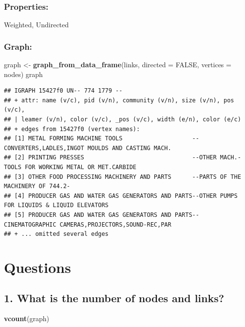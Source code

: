 \documentclass[
]{article}
\newenvironment{Shaded}{\begin{snugshade}}{\end{snugshade}}
\newcommand{\AttributeTok}[1]{\textcolor[rgb]{0.13,0.29,0.53}{#1}}
\newcommand{\ConstantTok}[1]{\textcolor[rgb]{0.56,0.35,0.01}{#1}}
\newcommand{\FunctionTok}[1]{\textcolor[rgb]{0.13,0.29,0.53}{\textbf{#1}}}
\newcommand{\NormalTok}[1]{#1}
\newcommand{\OtherTok}[1]{\textcolor[rgb]{0.56,0.35,0.01}{#1}}
\begin{document}
\subsubsection{Properties:}\label{properties}

Weighted, Undirected

\subsubsection{Graph:}\label{graph}

\begin{Shaded}
\begin{Highlighting}[]
\NormalTok{graph }\OtherTok{\textless{}{-}} \FunctionTok{graph\_from\_data\_frame}\NormalTok{(links, }\AttributeTok{directed =} \ConstantTok{FALSE}\NormalTok{, }\AttributeTok{vertices =}\NormalTok{ nodes)}
\NormalTok{graph}
\end{Highlighting}
\end{Shaded}

\begin{verbatim}
## IGRAPH 15427f0 UN-- 774 1779 -- 
## + attr: name (v/c), pid (v/n), community (v/n), size (v/n), pos (v/c),
## | leamer (v/n), color (v/c), _pos (v/c), width (e/n), color (e/c)
## + edges from 15427f0 (vertex names):
## [1] METAL FORMING MACHINE TOOLS                    --CONVERTERS,LADLES,INGOT MOULDS AND CASTING MACH.  
## [2] PRINTING PRESSES                               --OTHER MACH.-TOOLS FOR WORKING METAL OR MET.CARBIDE
## [3] OTHER FOOD PROCESSING MACHINERY AND PARTS      --PARTS OF THE MACHINERY OF 744.2-                  
## [4] PRODUCER GAS AND WATER GAS GENERATORS AND PARTS--OTHER PUMPS FOR LIQUIDS & LIQUID ELEVATORS        
## [5] PRODUCER GAS AND WATER GAS GENERATORS AND PARTS--CINEMATOGRAPHIC CAMERAS,PROJECTORS,SOUND-REC,PAR  
## + ... omitted several edges
\end{verbatim}

\section{Questions}\label{questions}

\subsection{1. What is the number of nodes and
links?}\label{what-is-the-number-of-nodes-and-links}

\begin{Shaded}
\begin{Highlighting}[]
\FunctionTok{vcount}\NormalTok{(graph)}
\end{Highlighting}
\end{Shaded}
\end{document}

